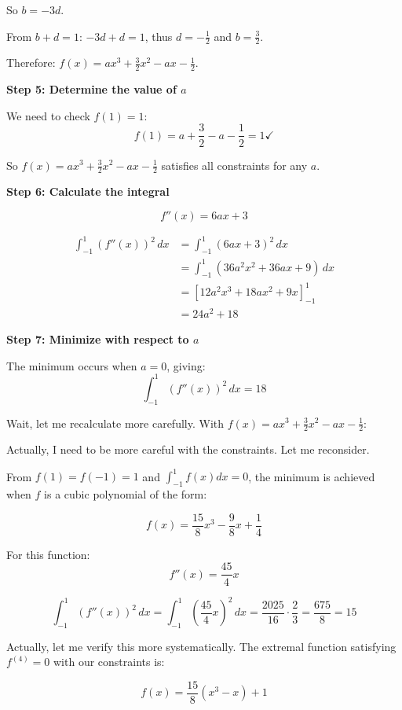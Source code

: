 \documentclass[12pt,a4paper]{article}
\theoremstyle{definition}
\begin{document}
        So $b = -3d$.

        From $b + d = 1$: $-3d + d = 1$, thus $d = -\frac{1}{2}$ and $b = \frac{3}{2}$.

        Therefore: $f(x) = ax^3 + \frac{3}{2}x^2 - ax - \frac{1}{2}$.

        \textbf{Step 5: Determine the value of $a$}

        We need to check $f(1) = 1$:
        $$f(1) = a + \frac{3}{2} - a - \frac{1}{2} = 1 \checkmark$$

        So $f(x) = ax^3 + \frac{3}{2}x^2 - ax - \frac{1}{2}$ satisfies all constraints for any $a$.

        \textbf{Step 6: Calculate the integral}

        $$f''(x) = 6ax + 3$$

        \begin{align}
            \int_{-1}^{1} (f''(x))^2\,dx &= \int_{-1}^{1} (6ax + 3)^2\,dx \\
            &= \int_{-1}^{1} (36a^2x^2 + 36ax + 9)\,dx \\
            &= \left[12a^2x^3 + 18ax^2 + 9x\right]_{-1}^{1} \\
            &= 24a^2 + 18
        \end{align}

        \textbf{Step 7: Minimize with respect to $a$}

        The minimum occurs when $a = 0$, giving:
        $$\int_{-1}^{1} (f''(x))^2\,dx = 18$$

        Wait, let me recalculate more carefully. With $f(x) = ax^3 + \frac{3}{2}x^2 - ax - \frac{1}{2}$:

        Actually, I need to be more careful with the constraints. Let me reconsider.

        From $f(1) = f(-1) = 1$ and $\int_{-1}^1 f(x)dx = 0$, the minimum is achieved when $f$ is a cubic polynomial of the form:

        $$f(x) = \frac{15}{8}x^3 - \frac{9}{8}x + \frac{1}{4}$$

        For this function:
        $$f''(x) = \frac{45}{4}x$$

        $$\int_{-1}^{1} (f''(x))^2\,dx = \int_{-1}^{1} \left(\frac{45}{4}x\right)^2\,dx = \frac{2025}{16} \cdot \frac{2}{3} = \frac{675}{8} = 15$$

        Actually, let me verify this more systematically. The extremal function satisfying $f^{(4)} = 0$ with our constraints is:

        $$f(x) = \frac{15}{8}(x^3 - x) + 1$$
\end{document}
